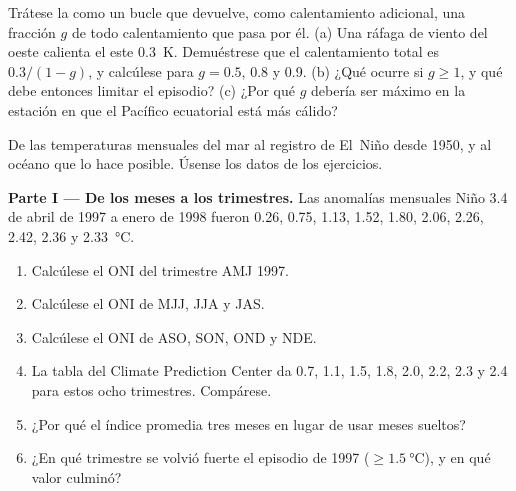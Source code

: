 \begin{exercise}[$\star\star\star$]\label{exo:b2:climate-variability:12}
Trátese la  como un bucle que devuelve, como calentamiento adicional, una fracción $g$ de todo
calentamiento que pasa por él. (a) Una ráfaga de viento del oeste calienta el este \qty{0.3}{K}. Demuéstrese
que el calentamiento total es $0.3/(1 - g)$, y calcúlese para $g = 0.5$, 0.8 y 0.9. (b) ¿Qué
ocurre si $g \geq 1$, y qué debe entonces limitar el episodio? (c) ¿Por qué $g$ debería ser máximo en la
estación en que el Pacífico ecuatorial está más cálido?
\end{exercise}

\begin{problem}\label{pb:b2:climate-variability:1}
De las temperaturas mensuales del mar al registro de El~Niño desde 1950, y al océano que lo hace
posible. Úsense los datos de los ejercicios.

\medskip\noindent\textbf{Parte I --- De los meses a los trimestres.}
Las anomalías mensuales Niño 3.4 de abril de 1997 a enero de 1998 fueron 0.26, 0.75, 1.13, 1.52, 1.80,
2.06, 2.26, 2.42, 2.36 y \qty{2.33}{\celsius}.
\begin{enumerate}
  \item Calcúlese el ONI del trimestre AMJ 1997.
  \item Calcúlese el ONI de MJJ, JJA y JAS.
  \item Calcúlese el ONI de ASO, SON, OND y NDE.
  \item La tabla del Climate Prediction Center da 0.7, 1.1, 1.5, 1.8, 2.0, 2.2, 2.3 y
        2.4 para estos ocho trimestres. Compárese.
  \item ¿Por qué el índice promedia tres meses en lugar de usar meses sueltos?
  \item ¿En qué trimestre se volvió fuerte el episodio de 1997 ($\geq \qty{1.5}{\celsius}$), y en
        qué valor culminó?
\end{enumerate}


\end{problem}
